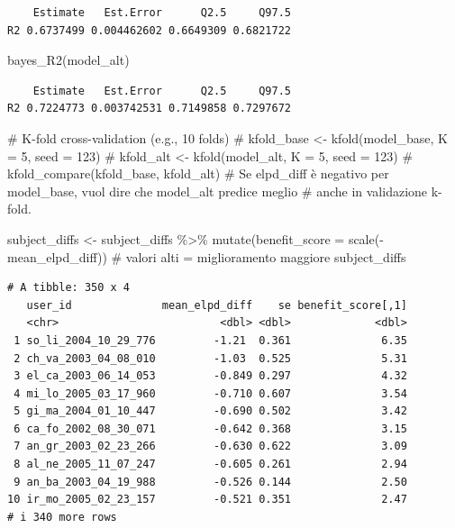 \documentclass[
  11pt,
  a4paper,
  onecolumn]{article}
\newenvironment{Shaded}{}{}
\newcommand{\AttributeTok}[1]{\textcolor[rgb]{0.84,0.23,0.29}{#1}}
\newcommand{\CommentTok}[1]{\textcolor[rgb]{0.42,0.45,0.49}{#1}}
\newcommand{\FunctionTok}[1]{\textcolor[rgb]{0.44,0.26,0.76}{#1}}
\newcommand{\NormalTok}[1]{\textcolor[rgb]{0.14,0.16,0.18}{#1}}
\newcommand{\OtherTok}[1]{\textcolor[rgb]{0.44,0.26,0.76}{#1}}
\newcommand{\SpecialCharTok}[1]{\textcolor[rgb]{0.00,0.36,0.77}{#1}}
\begin{document}
\begin{verbatim}
    Estimate   Est.Error      Q2.5     Q97.5
R2 0.6737499 0.004462602 0.6649309 0.6821722
\end{verbatim}

\begin{Shaded}
\begin{Highlighting}[]
\FunctionTok{bayes\_R2}\NormalTok{(model\_alt)}
\end{Highlighting}
\end{Shaded}

\begin{verbatim}
    Estimate   Est.Error      Q2.5     Q97.5
R2 0.7224773 0.003742531 0.7149858 0.7297672
\end{verbatim}

\begin{Shaded}
\begin{Highlighting}[]
\CommentTok{\# K{-}fold cross{-}validation (e.g., 10 folds)}
\CommentTok{\# kfold\_base \textless{}{-} kfold(model\_base, K = 5, seed = 123)}
\CommentTok{\# kfold\_alt  \textless{}{-} kfold(model\_alt,  K = 5, seed = 123)}
\CommentTok{\# kfold\_compare(kfold\_base, kfold\_alt)}
\CommentTok{\# Se elpd\_diff è negativo per model\_base, vuol dire che model\_alt predice meglio }
\CommentTok{\# anche in validazione k{-}fold.}
\end{Highlighting}
\end{Shaded}

\begin{Shaded}
\begin{Highlighting}[]
\NormalTok{subject\_diffs }\OtherTok{\textless{}{-}}\NormalTok{ subject\_diffs }\SpecialCharTok{\%\textgreater{}\%}
  \FunctionTok{mutate}\NormalTok{(}\AttributeTok{benefit\_score =} \FunctionTok{scale}\NormalTok{(}\SpecialCharTok{{-}}\NormalTok{mean\_elpd\_diff)) }
\CommentTok{\# valori alti = miglioramento maggiore}
\NormalTok{subject\_diffs}
\end{Highlighting}
\end{Shaded}

\begin{verbatim}
# A tibble: 350 x 4
   user_id              mean_elpd_diff    se benefit_score[,1]
   <chr>                         <dbl> <dbl>             <dbl>
 1 so_li_2004_10_29_776         -1.21  0.361              6.35
 2 ch_va_2003_04_08_010         -1.03  0.525              5.31
 3 el_ca_2003_06_14_053         -0.849 0.297              4.32
 4 mi_lo_2005_03_17_960         -0.710 0.607              3.54
 5 gi_ma_2004_01_10_447         -0.690 0.502              3.42
 6 ca_fo_2002_08_30_071         -0.642 0.368              3.15
 7 an_gr_2003_02_23_266         -0.630 0.622              3.09
 8 al_ne_2005_11_07_247         -0.605 0.261              2.94
 9 an_ba_2003_04_19_988         -0.526 0.144              2.50
10 ir_mo_2005_02_23_157         -0.521 0.351              2.47
# i 340 more rows
\end{verbatim}
\end{document}
